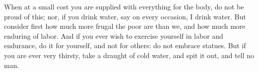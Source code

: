 When at a small  cost you are supplied with everything for the  body, do not be
proud of this; nor,  if you drink water, say on every  occasion, I drink water.
But consider first how much more frugal the poor are than we, and how much more
enduring of  labor. And  if you  ever wish  to exercise  yourself in  labor and
endurance, do it for yourself, and not  for others: do not embrace statues. But
if you are  ever very thirsty, take a  draught of cold water, and  spit it out,
and tell no man.
